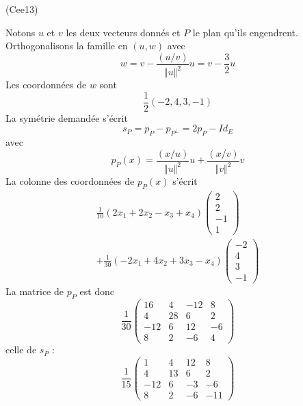 \begin{tiny}(Cee13)\end{tiny} Notons $u$ et $v$ les deux vecteurs donnés et $P$ le plan qu'ils engendrent. Orthogonalisons la famille en $(u,w)$ avec
\begin{displaymath}
 w = v-\frac{(u/v)}{\Vert u \Vert^2}u = v-\frac{3}{2}u
\end{displaymath}
Les coordonnées de $w$ sont
\begin{displaymath}
 \frac{1}{2}(-2,4,3,-1)
\end{displaymath}
La symétrie demandée s'écrit
\begin{displaymath}
 s_P = p_P - p_{P^{\perp}} = 2p_P -Id_E
\end{displaymath}
avec
\begin{displaymath}
 p_P(x) = \frac{(x/u)}{\Vert u\Vert^2} u + \frac{(x/v)}{\Vert v\Vert^2} v
\end{displaymath}
La colonne des coordonnées de $p_P(x)$ s'écrit
\begin{multline*}
 \frac{1}{10}(2x_1 + 2x_2 -x_3 + x_4)
\begin{pmatrix}
 2 \\ 2 \\ -1 \\1
\end{pmatrix} \\
+ \frac{1}{30}(-2x_1 + 4x_2 +3x_3 - x_4)
\begin{pmatrix}
 -2 \\ 4 \\ 3 \\ -1
\end{pmatrix}
\end{multline*}
La matrice de $p_P$ est donc
\begin{displaymath}
\frac{1}{30}
 \begin{pmatrix}
  16 & 4 & -12 & 8 \\
  4 & 28 & 6   & 2 \\
 -12 & 6  & 12 & -6 \\
  8 & 2  & -6  & 4 
 \end{pmatrix}
\end{displaymath}
celle de $s_P$ :
\begin{displaymath}
\frac{1}{15}
 \begin{pmatrix}
  1 & 4  & 12 & 8 \\
  4 & 13 & 6  & 2 \\
 -12 & 6 & -3 & -6 \\
  8 & 2  & -6 & -11 
 \end{pmatrix}
\end{displaymath}
